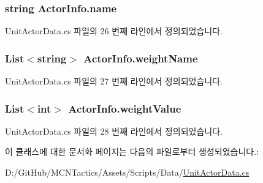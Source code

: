 \subsubsection[{\texorpdfstring{name}{name}}]{\setlength{\rightskip}{0pt plus 5cm}string Actor\+Info.\+name}\hypertarget{class_actor_info_a2e9e540cdc037f204d80622e47543410}{}\label{class_actor_info_a2e9e540cdc037f204d80622e47543410}


Unit\+Actor\+Data.\+cs 파일의 26 번째 라인에서 정의되었습니다.

\subsubsection[{\texorpdfstring{weight\+Name}{weightName}}]{\setlength{\rightskip}{0pt plus 5cm}List$<$string$>$ Actor\+Info.\+weight\+Name}\hypertarget{class_actor_info_a25bb8e0eafab630572ffddea088a1f80}{}\label{class_actor_info_a25bb8e0eafab630572ffddea088a1f80}


Unit\+Actor\+Data.\+cs 파일의 27 번째 라인에서 정의되었습니다.

\subsubsection[{\texorpdfstring{weight\+Value}{weightValue}}]{\setlength{\rightskip}{0pt plus 5cm}List$<$int$>$ Actor\+Info.\+weight\+Value}\hypertarget{class_actor_info_a1c5dd2d46e5ebc5a6483f2bcb55cb162}{}\label{class_actor_info_a1c5dd2d46e5ebc5a6483f2bcb55cb162}


Unit\+Actor\+Data.\+cs 파일의 28 번째 라인에서 정의되었습니다.



이 클래스에 대한 문서화 페이지는 다음의 파일로부터 생성되었습니다.\+:\begin{DoxyCompactItemize}
\item 
D\+:/\+Git\+Hub/\+M\+C\+N\+Tactics/\+Assets/\+Scripts/\+Data/\hyperlink{_unit_actor_data_8cs}{Unit\+Actor\+Data.\+cs}\end{DoxyCompactItemize}
